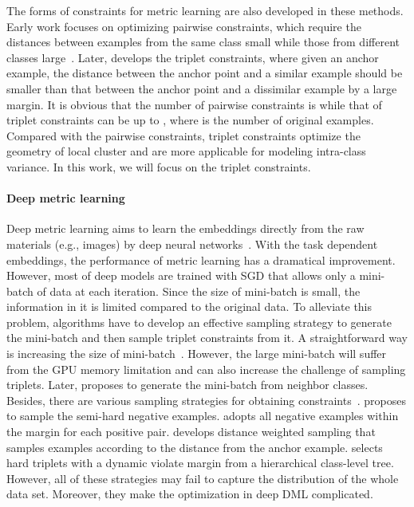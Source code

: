 \documentclass[10pt,twocolumn,letterpaper]{article}
\begin{document}
The forms of constraints for metric learning are also developed in these methods. Early work focuses on optimizing pairwise constraints, which require the distances between examples from the same class small while those from different classes large~\cite{XingNJR02}. Later, \cite{WeinbergerS09} develops the triplet constraints, where given an anchor example, the distance between the anchor point and a similar example should be smaller than that between the anchor point and a dissimilar example by a large margin. It is obvious that the number of pairwise constraints is  while that of triplet constraints can be up to , where  is the number of original examples. Compared with the pairwise constraints, triplet constraints optimize the geometry of local cluster and are more applicable for modeling intra-class variance. In this work, we will focus on the triplet constraints.

\paragraph{Deep metric learning}
Deep metric learning aims to learn the embeddings directly from the raw materials (e.g., images) by deep neural networks~\cite{ParkhiVZ15,SchroffKP15}. With the task dependent embeddings, the performance of metric learning has a dramatical improvement. However, most of deep models are trained with SGD that allows only a mini-batch of data at each iteration. Since the size of mini-batch is small, the information in it is limited compared to the original data. To alleviate this problem, algorithms have to develop an effective sampling strategy to generate the mini-batch and then sample triplet constraints from it. A straightforward way is increasing the size of mini-batch~\cite{SchroffKP15}. However, the large mini-batch will suffer from the GPU memory limitation and can also increase the challenge of sampling triplets. Later, \cite{RippelPDB15} proposes to generate the mini-batch from neighbor classes. Besides, there are various sampling strategies for obtaining constraints~\cite{GeHDS18,ManmathaWSK17,SchroffKP15,SongXJS16}. \cite{SchroffKP15} proposes to sample the semi-hard negative examples. \cite{SongXJS16} adopts all negative examples within the margin for each positive pair. \cite{ManmathaWSK17} develops distance weighted sampling that samples examples according to the distance from the anchor example. \cite{GeHDS18} selects hard triplets with a dynamic violate margin from a hierarchical class-level tree. However, all of these strategies may fail to capture the distribution of the whole data set. Moreover, they make the optimization in deep DML complicated. 
\end{document}
